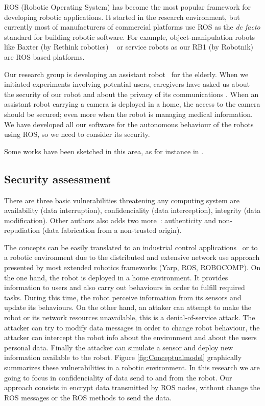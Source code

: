 \documentclass[journal,twoside]{JoPhA}
\begin{document}
ROS (Robotic Operating System) \cite{ROS09} has become the most popular framework for developing robotic applications. It started in the research environment, but currently most of manufacturers of commercial platforms use ROS as the {\em de facto} standard for building robotic software. For example, object-manipulation robots like Baxter (by Rethink robotics) ~\cite{fitzgerald2013developing} or service robots as our RB1 (by Robotnik) are ROS based platforms.

Our research group is developing an assistant robot~\cite{Martin2014} for the elderly. When we initiated experiments involving potential users, caregivers have asked us about the security of our robot and about the privacy of its communications \cite{Denning2009}. When an assistant robot carrying a camera is deployed in a home, the access to the camera should be secured; even more when the robot is managing medical information. We have developed all our software for the autonomous behaviour of the robots using ROS, so we need to consider its security.

Some works have been sketched in this area, as for instance in \cite{Guiochet2016}.



\subsection{Security assessment}

There are three basic vulnerabilities threatening any computing system are availability (data interruption), confidenciality (data interception), integrity (data modification). Other authors also  adds two more~\cite{sattarova2007security}: authenticity and non-repudiation (data fabrication from a non-trusted origin). 


The concepts can be easily translated to an industrial control applications~\cite{huitsing2008attack} or to a robotic environment due to the distributed and extensive network use approach presented by most extended robotics frameworks (Yarp, ROS, ROBOCOMP). On the one hand, the robot is deployed in a home environment. It provides information to users and also carry out behaviours in order to fulfill required tasks. During this time, the robot perceive information from its sensors and update its behaviours. 
On the other hand, an attaker can attempt to make the robot or its network resources unavailable, this is a denial-of-service attack. The attacker can try to modify data messages in order to change robot behaviour, the attacker can intercept the robot info about the environment and about the users personal data. Finally the attacker can simulate a sensor and deploy new information available to the robot. 
Figure \ref{fig:Conceptualmodel} graphically summarizes these vulnerabilities in a robotic environment. In this research we are going to focus in confidenciality of data send to and from the robot. Our approach consists in encrypt data transmitted by ROS nodes, without change the ROS messages or the ROS methods to send the data. 
\end{document}
